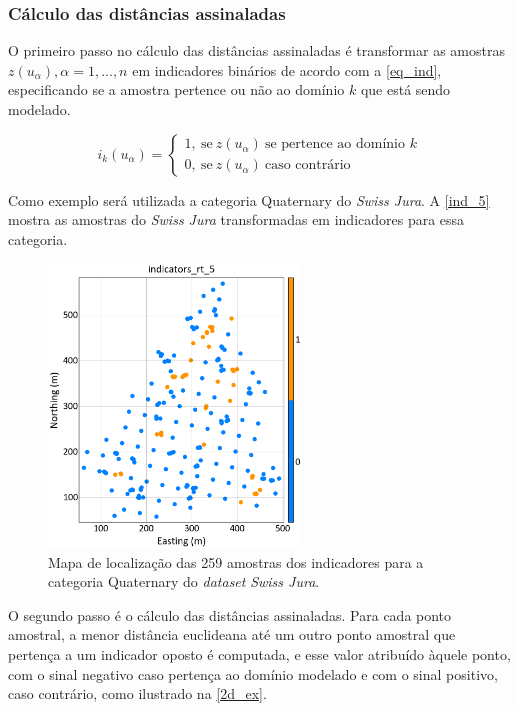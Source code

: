 \subsubsection{Cálculo das distâncias assinaladas}

O primeiro passo no cálculo das distâncias assinaladas é transformar as amostras ${z(u_\alpha),\alpha=1,...,n}$ em indicadores binários de acordo com a \autoref{eq_ind}, especificando se a amostra pertence ou não ao domínio $k$ que está sendo modelado.

\begin{equation}
	i_k(u_\alpha)=\begin{cases}
	1,\:\textrm{se}\:z(u_\alpha)\:\textrm{se pertence ao domínio $k$}\\
	0,\:\textrm{se}\:z(u_\alpha)\:\textrm{caso contrário}\end{cases}
    \label{eq_ind}
\end{equation}

Como exemplo será utilizada a categoria Quaternary do \textit{Swiss Jura}. A \autoref{ind_5} mostra as amostras do \textit{Swiss Jura} transformadas em indicadores para essa categoria.

\begin{figure}[H]
	\centering
	\caption{\label{ind_5}Mapa de localização das 259 amostras dos indicadores para a categoria Quaternary do \textit{dataset} \textit{Swiss Jura}.}
	\includegraphics[width=0.6\textwidth]{capitulo_2/imagens/ind5.png}
\end{figure}

O segundo passo é o cálculo das distâncias assinaladas. Para cada ponto amostral, a menor distância euclideana até um outro ponto amostral que pertença a um indicador oposto é computada, e esse valor atribuído àquele ponto, com o sinal negativo caso pertença ao domínio modelado e com o sinal positivo, caso contrário, como ilustrado na \autoref{2d_ex}. 

